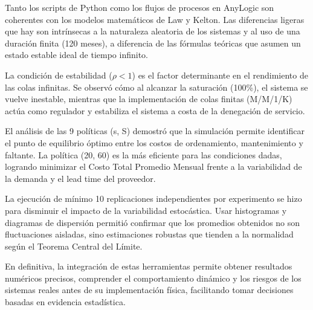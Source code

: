 \documentclass{article}
\begin{document}
Tanto los scripts de Python como los flujos de procesos en AnyLogic son coherentes con los modelos matemáticos de Law y Kelton. Las diferencias ligeras que hay son intrínsecas a la naturaleza aleatoria de los sistemas y al uso de una duración finita (120 meses), a diferencia de las fórmulas teóricas que asumen un estado estable ideal de tiempo infinito.

La condición de estabilidad ($\rho < 1$) es el factor determinante en el rendimiento de las colas infinitas. Se observó cómo al alcanzar la saturación (100\%), el sistema se vuelve inestable, mientras que la implementación de colas finitas (M/M/1/K) actúa como regulador y estabiliza el sistema a costa de la denegación de servicio.

El análisis de las 9 políticas (s, S) demostró que la simulación permite identificar el punto de equilibrio óptimo entre los costos de ordenamiento, mantenimiento y faltante. La política (20, 60) es la más eficiente para las condiciones dadas, logrando minimizar el Costo Total Promedio Mensual frente a la variabilidad de la demanda y el lead time del proveedor.

La ejecución de mínimo 10 replicaciones independientes por experimento se hizo para disminuir el impacto de la variabilidad estocástica. Usar histogramas y diagramas de dispersión permitió confirmar que los promedios obtenidos no son fluctuaciones aisladas, sino estimaciones robustas que tienden a la normalidad según el Teorema Central del Límite.

En definitiva, la integración de estas herramientas permite obtener resultados numéricos precisos, comprender el comportamiento dinámico y los riesgos de los sistemas reales antes de su implementación física, facilitando tomar decisiones basadas en evidencia estadística.


\nocite{*}



\end{document}
